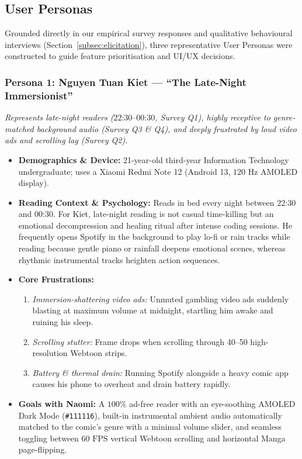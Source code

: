 \subsection{User Personas}
\label{subsec:personas}

Grounded directly in our empirical survey responses and qualitative behavioural interviews (Section~\ref{subsec:elicitation}), three representative User Personas were constructed to guide feature prioritisation and UI/UX decisions.

\subsubsection{Persona 1: Nguyen Tuan Kiet --- ``The Late-Night Immersionist''}
\textit{Represents late-night readers ($22\text{:}30\text{--}00\text{:}30$, Survey Q1), highly receptive to genre-matched background audio (Survey Q3 \& Q4), and deeply frustrated by loud video ads and scrolling lag (Survey Q2).}
\begin{itemize}
    \item \textbf{Demographics \& Device:} 21-year-old third-year Information Technology undergraduate; uses a Xiaomi Redmi Note 12 (Android 13, $120\text{ Hz}$ AMOLED display).
    \item \textbf{Reading Context \& Psychology:} Reads in bed every night between $22\text{:}30$ and $00\text{:}30$. For Kiet, late-night reading is not casual time-killing but an emotional decompression and healing ritual after intense coding sessions. He frequently opens Spotify in the background to play lo-fi or rain tracks while reading because gentle piano or rainfall deepens emotional scenes, whereas rhythmic instrumental tracks heighten action sequences.
    \item \textbf{Core Frustrations:}
    \begin{enumerate}[label=(\alph*)]
        \item \textit{Immersion-shattering video ads:} Unmuted gambling video ads suddenly blasting at maximum volume at midnight, startling him awake and ruining his sleep.
        \item \textit{Scrolling stutter:} Frame drops when scrolling through 40--50 high-resolution Webtoon strips.
        \item \textit{Battery \& thermal drain:} Running Spotify alongside a heavy comic app causes his phone to overheat and drain battery rapidly.
    \end{enumerate}
    \item \textbf{Goals with Naomi:} A $100\%$ ad-free reader with an eye-soothing AMOLED Dark Mode (\texttt{\#111116}), built-in instrumental ambient audio automatically matched to the comic's genre with a minimal volume slider, and seamless toggling between $60\text{ FPS}$ vertical Webtoon scrolling and horizontal Manga page-flipping.
\end{itemize}

